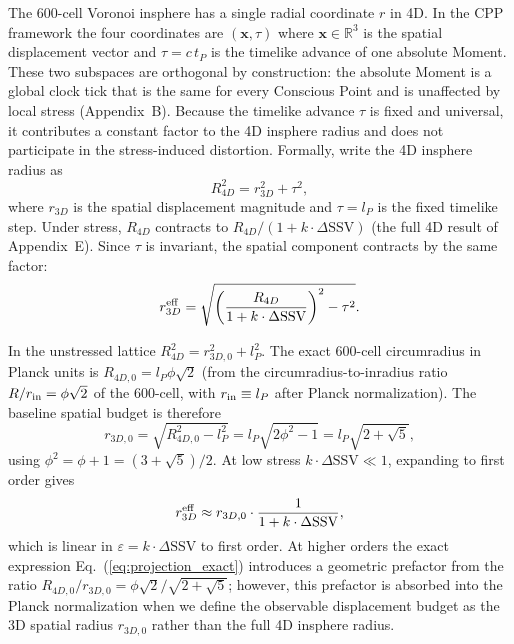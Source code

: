 \documentclass[11pt,letterpaper]{article}
\begin{document}
The 600-cell Voronoi insphere has a single radial coordinate $r$ in 4D. In the CPP framework the four coordinates are $(\mathbf{x}, \tau)$ where $\mathbf{x} 
\in \mathbb{R}^3$ is the spatial displacement vector and $\tau = c\,t_P$ is the timelike advance of one absolute Moment. These two subspaces are orthogonal by construction: the absolute Moment is a global clock tick that is the same for every Conscious Point and is unaffected by local stress (Appendix~B). Because the timelike advance $\tau$ is fixed and universal, it contributes a constant factor to the 4D insphere radius and does not participate in the stress-induced distortion. Formally, write the 4D insphere radius as
\begin{equation}
R_{4D}^2 = r_{3D}^2 + \tau^2,
\label{eq:4d_radius}
\end{equation}
where $r_{3D}$ is the spatial displacement magnitude and $\tau = l_P$ is the fixed timelike step. Under stress, $R_{4D}$ contracts to 
$R_{4D}/(1 + k\cdot\Delta\text{SSV})$ (the full 4D result of Appendix~E). Since $\tau$ is invariant, the spatial component contracts by the same factor:
\begin{equation}
r_{3D}^{\rm eff} = \sqrt{\left(\frac{R_{4D}}{1+k\cdot\Delta\text{SSV}}\right)^2 
- \tau^2}.
\label{eq:projection_exact}
\end{equation}

In the unstressed lattice $R_{4D}^2 = r_{3D,0}^2 + l_P^2$. The exact 
600-cell circumradius in Planck units is $R_{4D,0} = l_P\phi\sqrt{2}$ 
(from the circumradius-to-inradius ratio $R/r_{\rm in} = \phi\sqrt{2}$ 
of the 600-cell, with $r_{\rm in} \equiv l_P$ after Planck 
normalization). The baseline spatial budget is therefore
\[
r_{3D,0} = \sqrt{R_{4D,0}^2 - l_P^2} = l_P\sqrt{2\phi^2 - 1} 
= l_P\sqrt{2+\sqrt{5}},
\]
using $\phi^2 = \phi + 1 = (3+\sqrt{5})/2$. At low stress 
$k\cdot\Delta\text{SSV} \ll 1$, expanding to first order gives
\[
r_{3D}^{\rm eff} \approx r_{3D,0} \cdot \frac{1}{1 + k\cdot\Delta\text{SSV}},
\]
which is linear in $\varepsilon = k\cdot\Delta\text{SSV}$ to first 
order. At higher orders the exact expression 
Eq.~(\ref{eq:projection_exact}) introduces a geometric prefactor 
from the ratio $R_{4D,0}/r_{3D,0} = \phi\sqrt{2}/\sqrt{2+\sqrt{5}}$; 
however, this prefactor is absorbed into the Planck normalization 
when we define the observable displacement budget as the 3D spatial 
radius $r_{3D,0}$ rather than the full 4D insphere radius. 
\end{document}
